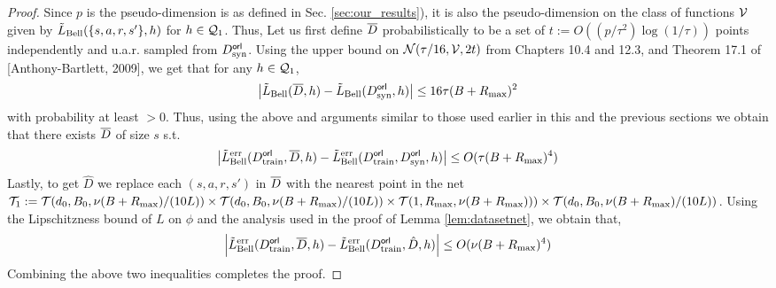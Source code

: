 \begin{proof}
    Since $p$ is the pseudo-dimension is as defined in Sec. \ref{sec:our_results}), it is also the pseudo-dimension on the class of functions $\mathcal{V}$ given by $\tilde{L}_{\textnormal{Bell}}(\{s,a,r,s'\}, h)$  for $h \in \mathcal{Q}_1$. Thus, Let us first define  $\overline{D}$ probabilistically to be a set of $t := O((p/\tau^2)\log(1/\tau))$ points independently and u.a.r. sampled from $D^{\sf orl}_{\textnormal{syn}}$. Using the upper bound on $\mathcal{N}(\tau/16, \mathcal{V}, 2t)$ from Chapters 10.4 and 12.3, and Theorem 17.1 of [Anthony-Bartlett, 2009], we get that  for any $h \in \mathcal{Q}_1$,
    \begin{equation}
        \left|\tilde{L}_{\textnormal{Bell}}(\overline{D}, h) - \tilde{L}_{\textnormal{Bell}}(D^{\sf orl}_{\textnormal{syn}}, h)  \right| \leq 16\tau(B+R_{\textnormal{max}})^2
    \end{equation}
    with probability at least $ > 0$. Thus, using the above and arguments similar to those used earlier in this and the previous sections we obtain that there exists $\overline{D}$ of size $s$ s.t.
    \begin{equation}
        \left|\tilde{L}^{\textnormal{err}}_{\textnormal{Bell}}(D^{\sf orl}_{\textnormal{train}}, \overline{D}, h) - \tilde{L}^{\textnormal{err}}_{\textnormal{Bell}}(D^{\sf orl}_{\textnormal{train}}, D^{\sf orl}_{\textnormal{syn}}, h)\right| \leq O(\tau(B+R_{\textnormal{max}})^4)
    \end{equation}
    Lastly, to get $\hat{D}$ we replace each $(s,a,r,s')$ in $\overline{D}$ with the nearest point in the net $\mathcal{T}_1 := \mathcal{T}(d_0, B_0, \nu(B+R_\textnormal{max})/(10L)) \times \mathcal{T}(d_0, B_0, \nu(B+R_\textnormal{max})/(10L)) \times \mathcal{T}(1, R_{\textnormal{max}},  \nu(B+R_\textnormal{max}))) \times \mathcal{T}(d_0, B_0, \nu(B+R_\textnormal{max})/(10L))$. Using the Lipschitzness bound of $L$ on $\phi$ and the analysis used in the proof of Lemma \ref{lem:datasetnet}, we obtain that,
    \begin{equation}
        \left|\tilde{L}^{\textnormal{err}}_{\textnormal{Bell}}(D^{\sf orl}_{\textnormal{train}}, \overline{D}, h) - \tilde{L}^{\textnormal{err}}_{\textnormal{Bell}}(D^{\sf orl}_{\textnormal{train}}, \hat{D}, h)\right| \leq O(\nu(B+R_{\textnormal{max}})^4)
    \end{equation}
    Combining the above two inequalities completes the proof.
\end{proof}

